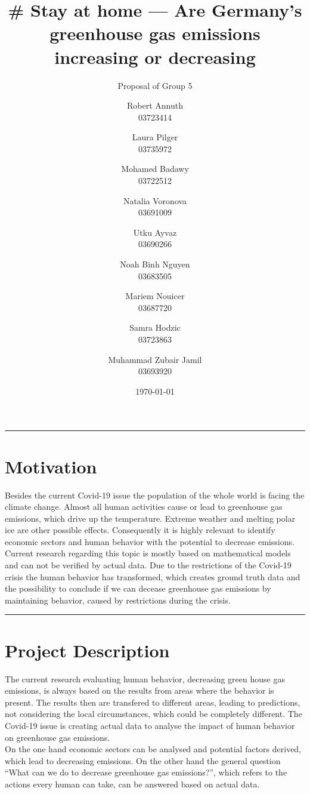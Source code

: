 \documentclass[lang=english,inputenc=utf8,fontsize=10pt]{ldvarticle}
\title{\# Stay at home --- Are Germany's greenhouse gas emissions increasing or decreasing}
\subtitle{Proposal of Group 5}
\author{Robert Annuth\\
03723414
\and
Laura Pilger\\
03735972
\and
Mohamed Badawy\\
03722512
\and
Natalia Voronova\\
03691009
\and
Utku Ayvaz\\
03690266
\and
Noah Binh Nguyen\\
03683505
\and
Mariem Nouicer\\
03687720
\and
Samra Hodzic\\
03723863
\and
Muhammad Zubair Jamil\\
03693920
}
\date{\today}
\begin{document}
\maketitle
\thispagestyle{empty}

\hrule

\section*{Motivation}



Besides the current Covid-19 issue the population of the whole world is facing the climate change. Almost all human activities cause or lead to greenhouse gas emissions, which drive up the temperature. Extreme weather and melting polar ice are other possible effects. Consequently it is highly relevant to identify economic sectors and human behavior with the potential to decrease emissions.\\

Current research regarding this topic is mostly based on mathematical models and can not be verified by actual data. Due to the restrictions of the Covid-19 crisis the human behavior has transformed, which creates ground truth data and the possibility to conclude if we can decease greenhouse gas emissions by maintaining behavior, caused by restrictions during the crisis.\\

\vspace*{1cm}
\hrule

\newpage

\section{Project Description}
The current research evaluating human behavior, decreasing green house gas emissions, is always based on the results from areas where the behavior is present. The results then are transfered to different areas, leading to predictions, not considering the local circumstances, which could be completely different. The Covid-19 issue is creating actual data to analyse the impact of human behavior on greenhouse gas emissions.\\

On the one hand economic sectors can be analysed and potential factors derived, which lead to decreasing emissions. On the other hand the general question \enquote{What can we do to decrease greenhouse gas emissions?}, which refers to the actions every human can take, can be answered based on actual data.\\
\end{document}

